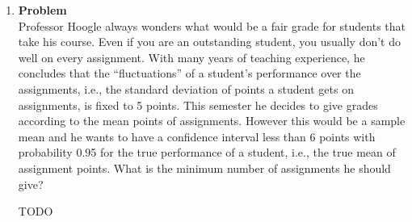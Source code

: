 \documentclass[12pt]{article}
\newenvironment{Ex}{\textbf{Problem}\vspace{.75em}\\}{}
\begin{document}
\begin{enumerate}
\begin{Ex}
\begin{enumerate}
      Democrat. Repeat part (a).
    \end{enumerate}
    \begin{solution} \hfill
      \begin{enumerate}
      \item In our case, $\alpha = 0.05$. The confidence interval is
        between $[\hat{\Theta}_n^{-}, \hat{\Theta}_n^{+}]$ for
        $1-\alpha$ so that $p_{\Theta}(\hat{\Theta}_n^{-} \le \theta
        \le \hat{\Theta}_n^{+}) \ge 1-\alpha$.
      \item {\huge \color{red} TODO}
      \end{enumerate}
    \end{solution}
  \end{Ex}
\item
  \begin{Ex}
    Professor Hoogle always wonders what would be a fair grade for
    students that take his course. Even if you are an outstanding
    student, you usually don’t do well on every assignment. With many
    years of teaching experience, he concludes that the
    ``fluctuations'' of a student’s performance over the assignments,
    i.e., the standard deviation of points a student gets on
    assignments, is fixed to 5 points. This semester he decides to
    give grades according to the mean points of assignments. However
    this would be a sample mean and he wants to have a confidence
    interval less than 6 points with probability 0.95 for the true
    performance of a student, i.e., the true mean of assignment
    points. What is the minimum number of assignments he should give?
    \begin{solution} \hfill
      {\huge \color{red} TODO}
    \end{solution}
  \end{Ex}
\end{enumerate}
\end{document}
